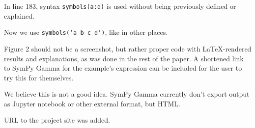 \documentclass[answers,12pt]{exam}
\begin{document}
\begin{questions}
\question In line 183, syntax \texttt{symbols(\textquotesingle{}a:d\textquotesingle{})} is used without being previously defined or explained.
\begin{solution}
Now we use \texttt{symbols('a b c d')}, like in other places.
\end{solution}

\question Figure 2 should not be a screenshot, but rather proper code with \LaTeX-rendered results and explanations, as was done in the rest of the paper. A
 shortened link to SymPy Gamma for the example's expression can be included
 for the user to try this for themselves.
\begin{solution}
We believe this is not a good idea.  SymPy Gamma currently
don't export output as Jupyter notebook or other external
format, but HTML.

URL to the project site was added.
\end{solution}

\end{questions}
\end{document}

